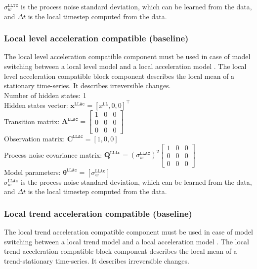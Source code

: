 \noindent
$\sigma_{w}^{\mathtt{LLTc}}$ is the process noise standard deviation, which can be learned from the data, and $\Delta t$ is the local timestep computed from the data.

\subsubsection{Local level acceleration compatible (baseline)}

The local level acceleration compatible component must be used in case of model switching between a local level model and a local acceleration model \cite{Nguyen2018}.
The local level acceleration compatible block component describes the local mean of a stationary time-series.
It describes irreversible changes.\\

\noindent
Number of hidden states: 1\\
Hidden states vector: $ \mathbf{x}^{\mathtt{LLAc}} = [x^{\mathtt{LL}}, 0, 0]^{\intercal}$\\
Transition matrix: $\mathbf{A}^{\mathtt{LLAc}}= \left[\begin{array}{ccc}1&0&0\\0&0&0\\0&0&0\end{array}\right]$\\
Observation matrix: $\mathbf{C}^{\mathtt{LLAc}}=[1, 0, 0]$\\
Process noise covariance matrix: $\mathbf{Q}^{\mathtt{LLAc}}=(\sigma_{w}^{\mathtt{LLAc}})^{2}\left[\begin{array}{ccc}1&0&0\\0&0&0\\0&0&0\end{array}\right]$\\
Model parameters: $\bm\theta^{\mathtt{LLAc}}=[\sigma_{w}^{\mathtt{LLAc}} ]$\\

\noindent
$\sigma_{w}^{\mathtt{LLAc}}$ is the process noise standard deviation, which can be learned from the data, and $\Delta t$ is the local timestep computed from the data.

\subsubsection{Local trend acceleration compatible (baseline)}
The local trend acceleration compatible component must be used in case of model switching between a local trend model and a local acceleration model \cite{Nguyen2018}.
The local trend acceleration compatible block component describes the local mean of a trend-stationary time-series. 
It describes irreversible changes.\\

